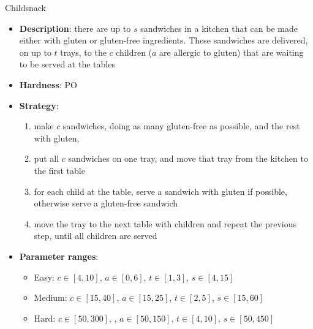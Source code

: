 \documentclass[aspectratio=169,xcolor=dvipsnames]{beamer}
\begin{document}
\begin{frame}{Childsnack}

    \begin{itemize}
        \item \textbf{Description}: there are up to $s$ sandwiches in a kitchen that can be made either with gluten or gluten-free ingredients. These sandwiches are delivered, on up to $t$ trays, to the $c$ children ($a$ are allergic to gluten) that are waiting to be served at the tables
        \item \textbf{Hardness}: PO %
        \item \textbf{Strategy}: 
        \begin{enumerate}
            \item make $c$ sandwiches, doing as many gluten-free as possible, and the rest with gluten,
            \item put all $c$ sandwiches on one tray, and move that tray from the kitchen to the first table
            \item for each child at the table, serve a sandwich with gluten if possible, otherwise serve a gluten-free sandwich
            \item move the tray to the next table with children and repeat the previous step, until all children are served
        \end{enumerate}
        \item \textbf{Parameter ranges}:
        \begin{itemize}
            \item Easy: $c\in[4, 10]$, $a\in[0, 6]$, $t\in[1, 3]$, $s\in[4, 15]$
            \item Medium: $c\in[15, 40]$, $a\in[15, 25]$, $t\in[2, 5]$, $s\in[15, 60]$
            \item Hard: $c\in[50, 300]$, , $a\in[50, 150]$, $t\in[4, 10]$, $s\in[50, 450]$
        \end{itemize}
    \end{itemize}

\end{frame}
\end{document}

